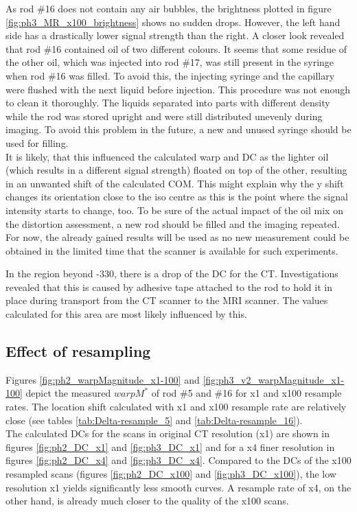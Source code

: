 As rod \#16 does not contain any air bubbles, the brightness plotted in figure \ref{fig:ph3_MR_x100_brightness} shows no sudden drops.
However, the left hand side has a drastically lower signal strength than the right.
A closer look revealed that rod \#16 contained oil of two different colours.
It seems that some residue of the other oil, which was injected into rod \#17, was still present in the syringe when rod \#16 was filled.
To avoid this, the injecting syringe and the capillary were flushed with the next liquid before injection.
This procedure was not enough to clean it thoroughly.
The liquids separated into parts with different density while the rod was stored upright and were still distributed unevenly during imaging.
To avoid this problem in the future, a new and unused syringe should be used for filling.\\

It is likely, that this influenced the calculated warp and DC as the lighter oil (which results in a different signal strength) floated on top of the other, resulting in an unwanted shift of the calculated COM.
This might explain why the y shift changes its orientation close to the iso centre as this is the point where the signal intensity starts to change, too.
To be sure of the actual impact of the oil mix on the distortion assessment, a new rod should be filled and the imaging repeated.
For now, the already gained results will be used as no new measurement could be obtained in the limited time that the scanner is available for such experiments.


In the region beyond -330, there is a drop of the DC for the CT.
Investigations revealed that this is caused by adhesive tape attached to the rod to hold it in place during transport from the CT scanner to the MRI scanner.
The values calculated for this area are most likely influenced by this.


\subsection{Effect of resampling}


Figures \ref{fig:ph2_warpMagnitude_x1-100} and \ref{fig:ph3_v2_warpMagnitude_x1-100} depict the measured $warpM^*$ of rod \#5 and \#16 for x1 and x100 resample rates.
The location shift calculated with x1 and x100 resample rate are relatively close (see tables \ref{tab:Delta-resample_5} and \ref{tab:Delta-resample_16}).\\

The calculated DCs for the scans in original CT resolution (x1) are shown in figures \ref{fig:ph2_DC_x1} and \ref{fig:ph3_DC_x1} and for a x4 finer resolution in figures \ref{fig:ph2_DC_x4} and \ref{fig:ph3_DC_x4}.
Compared to the DCs of the x100 resampled scans (figures \ref{fig:ph2_DC_x100} and \ref{fig:ph3_DC_x100}), the low resolution x1 yields significantly less smooth curves.
A resample rate of x4, on the other hand, is already much closer to the quality of the x100 scans.\\


